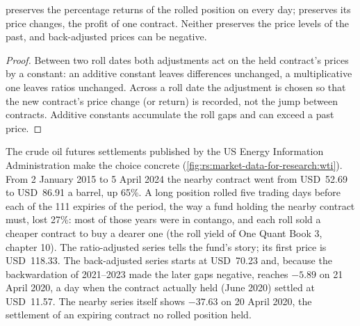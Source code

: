 \begin{proposition}\label{prop:rs:market-data-for-research:adjust}
 preserves the percentage returns of the rolled position on every day;  preserves its price
changes, the profit of one contract. Neither preserves the price levels of the past, and back-adjusted prices can be negative.
\end{proposition}

\begin{proof}
Between two roll dates both adjustments act on the held contract's prices by a constant: an additive constant leaves differences
unchanged, a multiplicative one leaves ratios unchanged. Across a roll date the adjustment is chosen so that the new contract's
price change (or return) is recorded, not the jump between contracts. Additive constants accumulate the roll gaps and can exceed
a past price.
\end{proof}

The crude oil futures settlements published by the US Energy Information Administration make the choice concrete
(\cref{fig:rs:market-data-for-research:wti}). From 2 January 2015 to 5 April 2024 the nearby contract went from USD~52.69 to
USD~86.91 a barrel, up 65\%. A long position rolled five trading days before each of the 111 expiries of the period, the way a
fund holding the nearby contract must, lost 27\%: most of those years were in contango, and each roll sold a cheaper contract to
buy a dearer one (the roll yield of One Quant Book 3, chapter 10). The ratio-adjusted series tells the fund's story; its first price is
USD~118.33. The back-adjusted series starts at USD~70.23 and, because the backwardation of 2021--2023 made the later gaps
negative, reaches $-5.89$ on 21 April 2020, a day when the contract actually held (June 2020) settled at USD~11.57. The nearby
series itself shows $-37.63$ on 20 April 2020, the settlement of an expiring contract no rolled position held.

